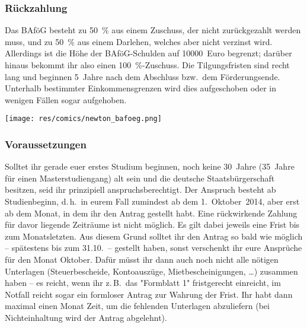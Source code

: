 \begin{multicols*}{2}
\subsubsection*{Rückzahlung}
Das BAföG besteht zu \SI{50}{\percent} aus einem Zuschuss, der nicht zurückgezahlt werden muss, und zu \SI{50}{\percent} aus einem Darlehen, welches aber nicht verzinst wird. Allerdings ist die Höhe der BAföG-Schulden auf \num{10000}~Euro begrenzt; darüber hinaus bekommt ihr also einen \SI{100}{\percent}-Zuschuss. Die Tilgungsfristen sind recht lang und beginnen 5~Jahre nach dem Abschluss bzw.\ dem Förderungsende. Unterhalb bestimmter Einkommensgrenzen wird dies aufgeschoben oder in wenigen Fällen sogar aufgehoben.
\vspace{-1em}
\begin{center}
\texttt{[image: res/comics/newton\_bafoeg.png]}
\end{center}

\subsubsection*{Voraussetzungen}
Solltet ihr gerade euer erstes Studium beginnen, noch keine 30~Jahre (35~Jahre für einen Masterstudiengang) alt sein und die deutsche Staatsbürgerschaft besitzen, seid ihr prinzipiell anspruchsberechtigt. Der Anspruch besteht ab Studienbeginn, d.\,h.\ in eurem Fall zumindest ab dem 1.~Oktober~2014, aber erst ab dem Monat, in dem ihr den Antrag gestellt habt. Eine rückwirkende Zahlung für davor liegende Zeiträume ist nicht möglich. Es gilt dabei jeweils eine Frist bis zum Monatsletzten. Aus diesem Grund solltet ihr den Antrag so bald wie möglich -- spätestens bis zum 31.10.\ -- gestellt haben, sonst verschenkt ihr eure Ansprüche für den Monat Oktober. Dafür müsst ihr dann auch noch nicht alle nötigen Unterlagen (Steuerbescheide, Kontoauszüge, Mietbescheinigungen, \dots) zusammen haben -- es reicht, wenn ihr z.\,B.\ das "Formblatt 1" fristgerecht einreicht, im Notfall reicht sogar ein formloser Antrag zur Wahrung der Frist. Ihr habt dann maximal einen Monat Zeit, um die fehlenden Unterlagen abzuliefern (bei Nichteinhaltung wird der Antrag abgelehnt).


\end{multicols*}
